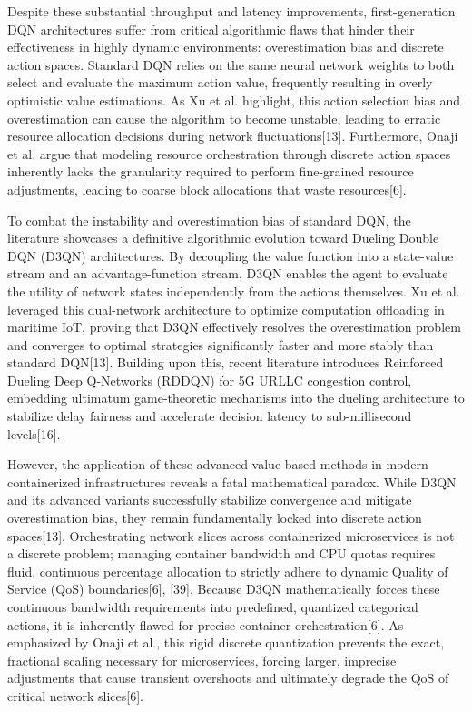 Despite these substantial throughput and latency improvements, first-generation DQN architectures suffer from critical algorithmic flaws that hinder their effectiveness in highly dynamic environments: overestimation bias and discrete action spaces. Standard DQN relies on the same neural network weights to both select and evaluate the maximum action value, frequently resulting in overly optimistic value estimations. As Xu et al. highlight, this action selection bias and overestimation can cause the algorithm to become unstable, leading to erratic resource allocation decisions during network fluctuations{[}13{]}. Furthermore, Onaji et al. argue that modeling resource orchestration through discrete action spaces inherently lacks the granularity required to perform fine-grained resource adjustments, leading to coarse block allocations that waste resources{[}6{]}.

To combat the instability and overestimation bias of standard DQN, the literature showcases a definitive algorithmic evolution toward Dueling Double DQN (D3QN) architectures. By decoupling the value function into a state-value stream and an advantage-function stream, D3QN enables the agent to evaluate the utility of network states independently from the actions themselves. Xu et al. leveraged this dual-network architecture to optimize computation offloading in maritime IoT, proving that D3QN effectively resolves the overestimation problem and converges to optimal strategies significantly faster and more stably than standard DQN{[}13{]}. Building upon this, recent literature introduces Reinforced Dueling Deep Q-Networks (RDDQN) for 5G URLLC congestion control, embedding ultimatum game-theoretic mechanisms into the dueling architecture to stabilize delay fairness and accelerate decision latency to sub-millisecond levels{[}16{]}.

However, the application of these advanced value-based methods in modern containerized infrastructures reveals a fatal mathematical paradox. While D3QN and its advanced variants successfully stabilize convergence and mitigate overestimation bias, they remain fundamentally locked into discrete action spaces{[}13{]}. Orchestrating network slices across containerized microservices is not a discrete problem; managing container bandwidth and CPU quotas requires fluid, continuous percentage allocation to strictly adhere to dynamic Quality of Service (QoS) boundaries{[}6{]}, {[}39{]}. Because D3QN mathematically forces these continuous bandwidth requirements into predefined, quantized categorical actions, it is inherently flawed for precise container orchestration{[}6{]}. As emphasized by Onaji et al., this rigid discrete quantization prevents the exact, fractional scaling necessary for microservices, forcing larger, imprecise adjustments that cause transient overshoots and ultimately degrade the QoS of critical network slices{[}6{]}.

